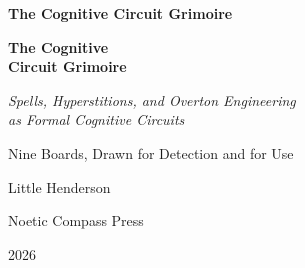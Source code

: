 
\frontmatter
\pagestyle{plainbook}

\thispagestyle{empty}
\begin{center}
  \vspace*{2.5in}
  {\huge\bfseries The Cognitive Circuit Grimoire\par}
\end{center}
\cleardoublepage

\thispagestyle{empty}
\begin{center}
  \vspace*{1.1in}
  {\Huge\bfseries The Cognitive\\[0.10in] Circuit Grimoire\par}
  \vspace{0.55in}
  {\Large\itshape Spells, Hyperstitions, and Overton Engineering\\[0.10in]
   as Formal Cognitive Circuits\par}
  \vspace{0.35in}
  {\large Nine Boards, Drawn for Detection and for Use\par}
  \vspace{1.20in}
  {\Large Little Henderson\par}
  \vfill
  {\normalsize Noetic Compass Press\par}
  {\small 2026\par}
\end{center}
\clearpage

